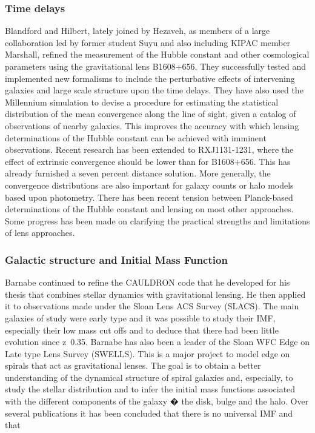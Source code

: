 \documentclass[psfig,11pt]{article}
\begin{document}
\subsubsection{Time delays}
Blandford and Hilbert, lately joined by Hezaveh, as members of a large collaboration led by former student Suyu and also including KIPAC member Marshall, refined  the measurement of the Hubble constant and other cosmological parameters using the gravitational lens B1608+656. They successfully tested and implemented new formalisms to include the perturbative effects of intervening galaxies and large scale structure upon the time delays.  They have also used the Millennium simulation to devise a procedure for estimating the statistical distribution of the mean convergence along the line of sight, given a catalog of observations of nearby galaxies. This improves the accuracy with which lensing determinations of the Hubble constant can be achieved with imminent observations. Recent research has been extended to RXJ1131-1231, where the effect of extrinsic convergence should be lower than for B1608+656. This has already furnished a seven percent distance solution. More generally, the convergence distributions are also important for galaxy counts or halo models based upon photometry. There has been recent tension between Planck-based determinations of the Hubble constant and lensing on most other approaches. Some progress has been made on clarifying the practical strengths and limitations of lens approaches.
\subsubsection{Galactic structure and Initial Mass Function}
Barnabe continued to refine the CAULDRON code that he developed for his thesis that combines stellar dynamics with gravitational lensing. He then applied it to observations made under the Sloan Lens ACS Survey (SLACS). The main galaxies of study were early type and it was possible to study their IMF, especially their low mass cut offs and to deduce that there had been little evolution since z~0.35. Barnabe has also been a leader of the Sloan WFC Edge on Late type Lens Survey  (SWELLS). This is a major project to model edge on spirals that act as gravitational lenses.  The goal is to obtain a better understanding of the dynamical structure of spiral galaxies and, especially, to study the stellar distribution and to infer the  initial mass functions associated with the different components of the galaxy � the disk, bulge and the halo. Over several publications it has been concluded that there is no universal IMF and that
\end{document}
